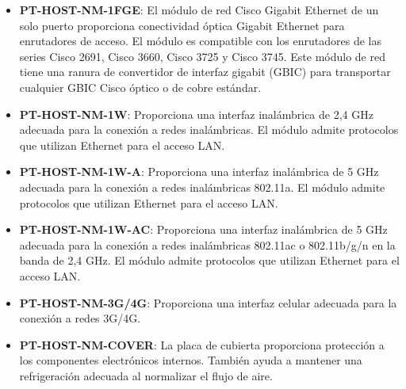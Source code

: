 \documentclass{article}
\begin{document}
\begin{itemize}
\begin{itemize}
\begin{itemize}
                    \item\textbf{PT-HOST-NM-1FGE}: El módulo de red Cisco Gigabit Ethernet de un solo puerto proporciona conectividad óptica Gigabit Ethernet para enrutadores de acceso. El módulo es compatible con los enrutadores de las series Cisco 2691, Cisco 3660, Cisco 3725 y Cisco 3745. Este módulo de red tiene una ranura de convertidor de interfaz gigabit (GBIC) para transportar cualquier GBIC Cisco óptico o de cobre estándar.
                    \item\textbf{PT-HOST-NM-1W}: Proporciona una interfaz inalámbrica de 2,4 GHz adecuada para la conexión a redes inalámbricas. El módulo admite protocolos que utilizan Ethernet para el acceso LAN. 
                    \item\textbf{PT-HOST-NM-1W-A}: Proporciona una interfaz inalámbrica de 5 GHz adecuada para la conexión a redes inalámbricas 802.11a. El módulo admite protocolos que utilizan Ethernet para el acceso LAN.
                    \item\textbf{PT-HOST-NM-1W-AC}: Proporciona una interfaz inalámbrica de 5 GHz adecuada para la conexión a redes inalámbricas 802.11ac o 802.11b/g/n en la banda de 2,4 GHz. El módulo admite protocolos que utilizan Ethernet para el acceso LAN.
                    \item\textbf{PT-HOST-NM-3G/4G}: Proporciona una interfaz celular adecuada para la conexión a redes 3G/4G.
                    \item\textbf{PT-HOST-NM-COVER}: La placa de cubierta proporciona protección a los componentes electrónicos internos. También ayuda a mantener una refrigeración adecuada al normalizar el flujo de aire.
 

\end{itemize}
\end{itemize}
\end{itemize}
\end{document}
